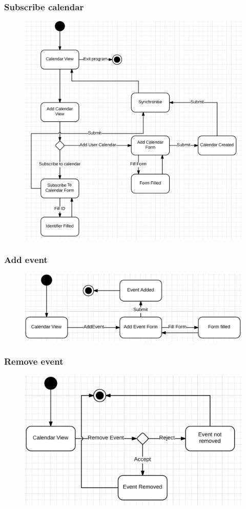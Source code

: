 \subsubsection{Subscribe calendar}
\begin{figure}[h]
\includegraphics[scale=0.70]{subcalendarstate.png}
\end{figure}

\clearpage
\subsubsection{Add event}
\begin{figure}[h]
\includegraphics[scale=0.8]{addeventstate.png}
\end{figure}

\clearpage
\subsubsection{Remove event}
\begin{figure}[h]
\includegraphics[scale=0.8]{eventremovestate.png}
\end{figure}